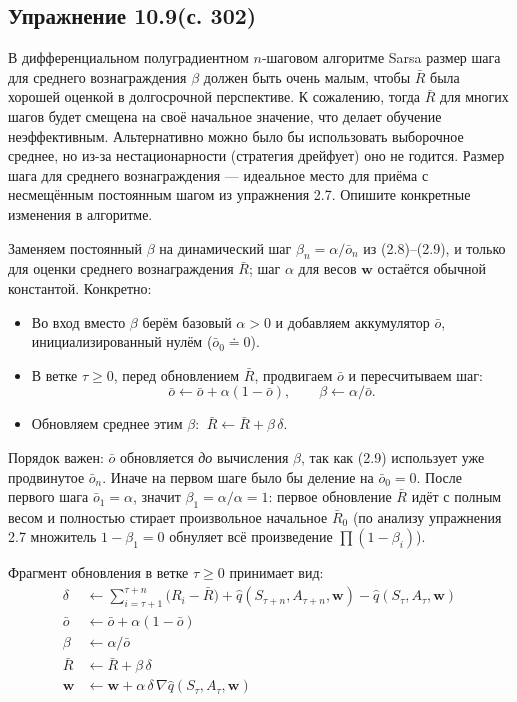\subsection{Упражнение 10.9(с. 302)}
В дифференциальном полуградиентном $n$-шаговом алгоритме Sarsa размер шага для среднего вознаграждения $\beta$ должен быть очень малым, чтобы $\bar R$ была хорошей оценкой в долгосрочной перспективе. К сожалению, тогда $\bar R$ для многих шагов будет смещена на своё начальное значение, что делает обучение неэффективным. Альтернативно можно было бы использовать выборочное среднее, но из-за нестационарности (стратегия дрейфует) оно не годится. Размер шага для среднего вознаграждения --- идеальное место для приёма с несмещённым постоянным шагом из упражнения 2.7. Опишите конкретные изменения в алгоритме.

\begin{solution}
    Заменяем постоянный $\beta$ на динамический шаг $\beta_n=\alpha/\bar o_n$ из
    (2.8)--(2.9), и только для оценки среднего вознаграждения $\bar R$; шаг
    $\alpha$ для весов $\mathbf w$ остаётся обычной константой. Конкретно:

    \begin{itemize}
        \item Во вход вместо $\beta$ берём базовый $\alpha>0$ и добавляем
            аккумулятор $\bar o$, инициализированный нулём ($\bar o_0\doteq 0$).
        \item В ветке $\tau\ge 0$, перед обновлением $\bar R$, продвигаем $\bar o$
            и пересчитываем шаг:
            \begin{equation*}
                \bar o \leftarrow \bar o + \alpha(1-\bar o), \qquad
                \beta \leftarrow \alpha/\bar o.
            \end{equation*}
        \item Обновляем среднее этим $\beta$: $\ \bar R \leftarrow \bar R + \beta\,\delta$.
    \end{itemize}

    Порядок важен: $\bar o$ обновляется \emph{до} вычисления $\beta$, так как
    (2.9) использует уже продвинутое $\bar o_n$. Иначе на первом шаге было бы
    деление на $\bar o_0=0$. После первого шага $\bar o_1=\alpha$, значит
    $\beta_1=\alpha/\alpha=1$: первое обновление $\bar R$ идёт с полным весом и
    полностью стирает произвольное начальное $\bar R_0$ (по анализу упражнения 2.7
    множитель $1-\beta_1=0$ обнуляет всё произведение $\prod(1-\beta_i)$).

    Фрагмент обновления в ветке $\tau\ge 0$ принимает вид:
    \begin{align*}
        \delta &\leftarrow \sum_{i=\tau+1}^{\tau+n}\big(R_i-\bar R\big)
                 + \hat q(S_{\tau+n},A_{\tau+n},\mathbf w) - \hat q(S_\tau,A_\tau,\mathbf w)\\
        \bar o &\leftarrow \bar o + \alpha(1-\bar o)\\
        \beta  &\leftarrow \alpha/\bar o\\
        \bar R &\leftarrow \bar R + \beta\,\delta\\
        \mathbf w &\leftarrow \mathbf w + \alpha\,\delta\,\nabla\hat q(S_\tau,A_\tau,\mathbf w)
    \end{align*}


\end{solution}
